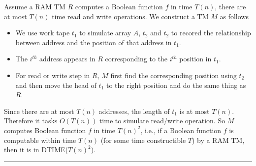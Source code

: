 \documentclass[twoside]{article}
\newenvironment{problem}[2][Problem]{\begin{trivlist}
		\item[\hskip \labelsep {\bfseries #1}\hskip \labelsep {\bfseries #2.}]}{\end{trivlist}}
\newenvironment{solution}{{\bf Solution:}}{\hfill\rule{2mm}{2mm}}
\begin{document}
\begin{problem}{1.9}
\end{problem}
\begin{solution}
	Assume a RAM TM $R$ computes a Boolean function $f$ in time $T(n)$, there are at most $T(n)$ time read and write operations.
	We construct a TM $M$ as follows
	\begin{itemize}
		\item We use work tape $t_1$ to simulate array $A$, $t_2$ and $t_2$ to recored the relationship between address and the position of that address in $t_1$.
		\item The $i^{th}$ address appears in $R$ corresponding to the $i^{th}$ position in $t_1$.
		\item For read or write step in $R$, $M$ first find the corresponding position using $t_2$ and then move the head of $t_1$ to the right position and do the same thing as $R$.
	\end{itemize}
Since there are at most $T(n)$ addresses, the length of $t_1$ is at most $T(n)$. 
Therefore it tasks $O(T(n))$ time to simulate read/write operation.
So $M$ computes Boolean function $f$ in time $T(n)^2$, i.e., if a Boolean function $f$ is computable within time $T(n)$ (for some time constructible $T$) by a RAM TM, then it is in DTIME($T(n)^2$).
\end{solution}

\begin{problem}{1.13}
\end{problem}
\end{document}
